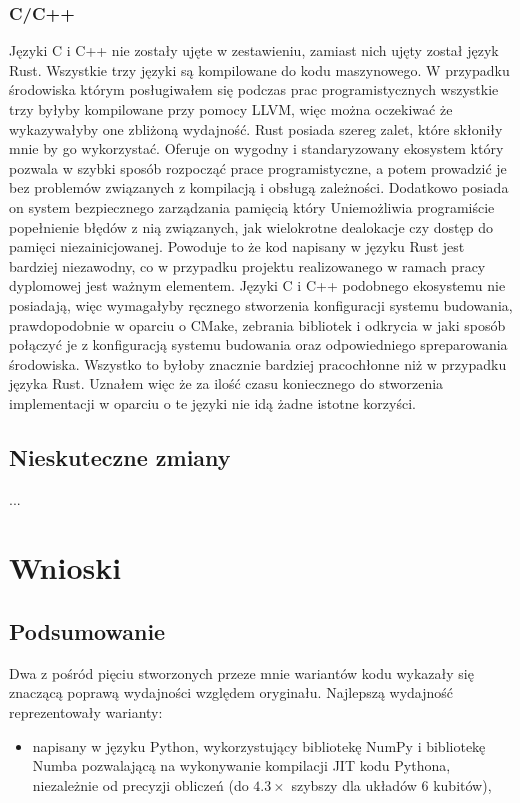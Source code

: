 \documentclass[11pt, a4paper]{article}
\begin{document}
\begin{sloppypar}
    \subsubsection{C/C++}
    Języki C i C++ nie zostały ujęte w zestawieniu, zamiast nich ujęty został język Rust.
    Wszystkie trzy języki są kompilowane do kodu maszynowego. W przypadku środowiska
    którym posługiwałem się podczas prac programistycznych wszystkie trzy byłyby
    kompilowane przy pomocy LLVM, więc można oczekiwać że wykazywałyby one zbliżoną wydajność.
    Rust posiada szereg zalet, które skłoniły mnie by go wykorzystać. Oferuje on wygodny
    i standaryzowany ekosystem który pozwala w szybki sposób rozpocząć prace
    programistyczne, a potem prowadzić je bez problemów związanych z kompilacją i obsługą
    zależności. Dodatkowo posiada on system bezpiecznego zarządzania pamięcią który
    Uniemożliwia programiście popełnienie błędów z nią związanych, jak wielokrotne dealokacje
    czy dostęp do pamięci niezainicjowanej. Powoduje to że kod napisany w języku Rust
    jest bardziej niezawodny, co w przypadku projektu realizowanego w ramach pracy dyplomowej
    jest ważnym elementem. Języki C i C++ podobnego ekosystemu nie posiadają, więc wymagałyby
    ręcznego stworzenia konfiguracji systemu budowania, prawdopodobnie w oparciu o CMake,
    zebrania bibliotek i odkrycia w jaki sposób połączyć je z konfiguracją systemu budowania
    oraz odpowiedniego spreparowania środowiska. Wszystko to byłoby znacznie bardziej
    pracochłonne niż w przypadku języka Rust. Uznałem więc że za ilość czasu koniecznego
    do stworzenia implementacji w oparciu o te języki nie idą żadne istotne korzyści.

    \subsection{Nieskuteczne zmiany}
    ...

    \section{Wnioski}
    \subsection{Podsumowanie}
    Dwa z pośród pięciu stworzonych przeze mnie wariantów kodu wykazały się znaczącą
    poprawą wydajności względem oryginału. Najlepszą wydajność reprezentowały warianty:
    \begin{itemize}
      \item napisany w języku Python, wykorzystujący bibliotekę NumPy i bibliotekę Numba
        pozwalającą na wykonywanie kompilacji JIT kodu Pythona, niezależnie od precyzji obliczeń
        (do $4.3\times$ szybszy dla układów 6 kubitów),


\end{itemize}
\end{sloppypar}
\end{document}

